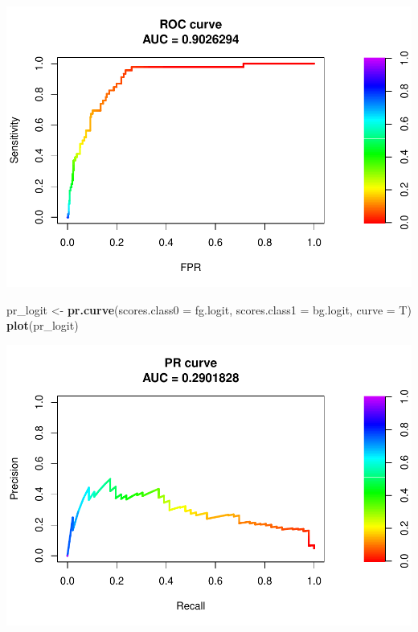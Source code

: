 \documentclass[]{article}
\newenvironment{Shaded}{\begin{snugshade}}{\end{snugshade}}
\newcommand{\DataTypeTok}[1]{\textcolor[rgb]{0.13,0.29,0.53}{#1}}
\newcommand{\DecValTok}[1]{\textcolor[rgb]{0.00,0.00,0.81}{#1}}
\newcommand{\FloatTok}[1]{\textcolor[rgb]{0.00,0.00,0.81}{#1}}
\newcommand{\KeywordTok}[1]{\textcolor[rgb]{0.13,0.29,0.53}{\textbf{#1}}}
\newcommand{\NormalTok}[1]{#1}
\newcommand{\OperatorTok}[1]{\textcolor[rgb]{0.81,0.36,0.00}{\textbf{#1}}}
\newcommand{\StringTok}[1]{\textcolor[rgb]{0.31,0.60,0.02}{#1}}
\begin{document}
\includegraphics{ml_analysis_lagged_with_imputation_files/figure-latex/unnamed-chunk-11-1.pdf}

\begin{Shaded}
\begin{Highlighting}[]
\NormalTok{pr_logit <-}\StringTok{ }\KeywordTok{pr.curve}\NormalTok{(}\DataTypeTok{scores.class0 =}\NormalTok{ fg.logit,}
                     \DataTypeTok{scores.class1 =}\NormalTok{ bg.logit,}
                     \DataTypeTok{curve =}\NormalTok{ T)}
\KeywordTok{plot}\NormalTok{(pr_logit) }
\end{Highlighting}
\end{Shaded}

\includegraphics{ml_analysis_lagged_with_imputation_files/figure-latex/unnamed-chunk-12-1.pdf}

\begin{Shaded}
\end{Shaded}
\end{document}
